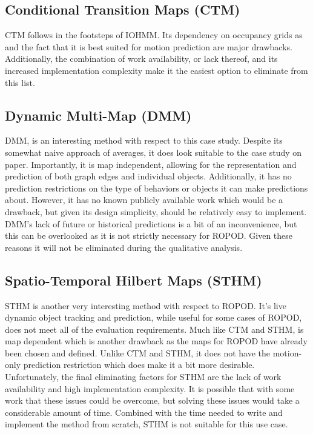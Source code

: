   \subsection { Conditional Transition Maps (CTM) }
  CTM follows in the footsteps of IOHMM. Its dependency on occupancy grids as
  and the fact that it is best suited for motion prediction are major drawbacks.
  Additionally, the combination of work availability, or lack thereof, and
  its increased implementation complexity make it the easiest option to
  eliminate from this list.

  \subsection { Dynamic Multi-Map (DMM) }
  DMM, is an interesting
  method with respect to this case study. Despite its somewhat naive approach
  of averages, it does look suitable to the case study on paper. Importantly, it is map
  independent, allowing for the representation and prediction of both graph edges and individual
  objects. Additionally, it has no prediction restrictions on the type of
  behaviors or objects it can make predictions about. However, it has no known publicly available
  work which would be a drawback, but given its design simplicity, should
  be relatively easy to implement. DMM's lack of future or historical
  predictions is a bit of an inconvenience, but this can be overlooked as it is not
  strictly necessary for ROPOD. Given these reasons it will not be eliminated
  during the qualitative analysis.

  \subsection{ Spatio-Temporal Hilbert Maps (STHM) }
  STHM is another very interesting method with respect to ROPOD.
  It's live dynamic object tracking and prediction, while useful for some
  cases of ROPOD, does not meet all of the evaluation requirements.
  Much like CTM and
  STHM, is map dependent which is another drawback as the maps for
  ROPOD have already been chosen and defined. Unlike CTM and STHM, it does not
  have the motion-only prediction restriction which does make it a bit more
  desirable. Unfortunately, the final eliminating factors for STHM are the lack
  of work availability and high implementation complexity. It is possible that with some
  work that these issues could be overcome, but solving these issues would take
  a considerable amount of time. Combined with the time needed to write
  and implement the method from scratch, STHM is not suitable for this
  use case.

